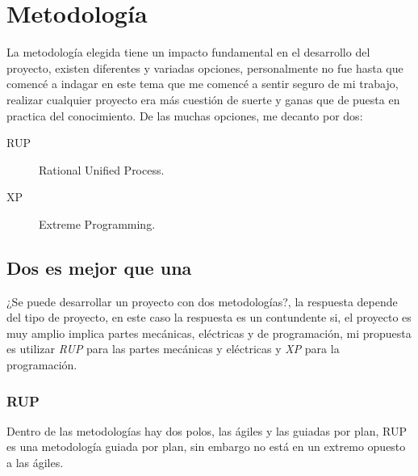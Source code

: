 \chapter{Metodología}
La metodología elegida tiene un impacto fundamental en el desarrollo del proyecto,
existen diferentes y variadas opciones, personalmente no fue hasta que comencé a 
indagar en este tema que me comencé a sentir seguro de mi trabajo, realizar 
cualquier proyecto era más cuestión de suerte y ganas que de puesta en 
practica del conocimiento. De las muchas opciones, me decanto por dos:
\begin{description}
	\item[RUP] Rational Unified Process.
	\item[XP] Extreme Programming.
\end{description}
\section{Dos es mejor que una}
¿Se puede desarrollar un proyecto con dos metodologías?, la respuesta depende del
tipo de proyecto, en este caso la respuesta es un contundente si, el proyecto es
muy amplio implica partes mecánicas, eléctricas y de programación, mi propuesta 
es utilizar \emph{RUP} para las partes mecánicas y eléctricas y \emph{XP} para 
la programación.
\subsection{RUP}
Dentro de las metodologías hay dos polos, las ágiles y las guiadas por plan, 
RUP
es una metodología guiada por plan, sin embargo no está en un extremo opuesto a
las ágiles.

